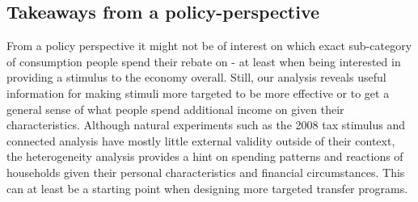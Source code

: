 \subsection{Takeaways from a policy-perspective}
From a policy perspective it might not be of interest on which exact sub-category of consumption people spend their rebate on - at least when being interested in providing a stimulus to the economy overall. Still, our analysis reveals useful information for making stimuli more targeted to be more effective or to get a general sense of what people spend additional income on given their characteristics. Although natural experiments such as the 2008 tax stimulus and connected analysis have mostly little external validity outside of their context, the heterogeneity analysis provides a hint on spending patterns and reactions of households given their personal characteristics and financial circumstances. This can at least be a starting point when designing more targeted transfer programs. 